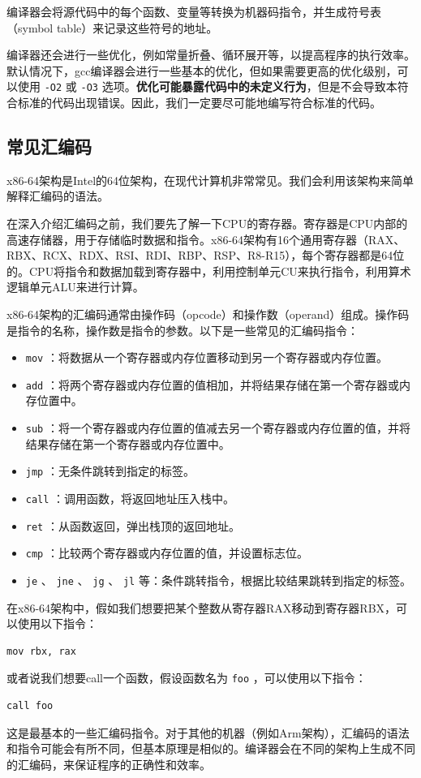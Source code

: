 编译器会将源代码中的每个函数、变量等转换为机器码指令，并生成符号表（symbol table）来记录这些符号的地址。

编译器还会进行一些优化，例如常量折叠、循环展开等，以提高程序的执行效率。默认情况下，gcc编译器会进行一些基本的优化，但如果需要更高的优化级别，可以使用 \texttt{-O2} 或 \texttt{-O3} 选项。\textbf{优化可能暴露代码中的未定义行为}，但是不会导致本符合标准的代码出现错误。因此，我们一定要尽可能地编写符合标准的代码。

\subsection{常见汇编码}

x86-64架构是Intel的64位架构，在现代计算机非常常见。我们会利用该架构来简单解释汇编码的语法。

在深入介绍汇编码之前，我们要先了解一下CPU的寄存器。寄存器是CPU内部的高速存储器，用于存储临时数据和指令。x86-64架构有16个通用寄存器（RAX、RBX、RCX、RDX、RSI、RDI、RBP、RSP、R8-R15），每个寄存器都是64位的。CPU将指令和数据加载到寄存器中，利用控制单元CU来执行指令，利用算术逻辑单元ALU来进行计算。

x86-64架构的汇编码通常由操作码（opcode）和操作数（operand）组成。操作码是指令的名称，操作数是指令的参数。以下是一些常见的汇编码指令：
\begin{itemize}
  \item  \texttt{mov} ：将数据从一个寄存器或内存位置移动到另一个寄存器或内存位置。
  \item  \texttt{add} ：将两个寄存器或内存位置的值相加，并将结果存储在第一个寄存器或内存位置中。
  \item  \texttt{sub} ：将一个寄存器或内存位置的值减去另一个寄存器或内存位置的值，并将结果存储在第一个寄存器或内存位置中。
  \item  \texttt{jmp} ：无条件跳转到指定的标签。
  \item  \texttt{call} ：调用函数，将返回地址压入栈中。
  \item  \texttt{ret} ：从函数返回，弹出栈顶的返回地址。
  \item  \texttt{cmp} ：比较两个寄存器或内存位置的值，并设置标志位。
  \item  \texttt{je} 、 \texttt{jne} 、 \texttt{jg} 、 \texttt{jl} 等：条件跳转指令，根据比较结果跳转到指定的标签。
\end{itemize}

在x86-64架构中，假如我们想要把某个整数从寄存器RAX移动到寄存器RBX，可以使用以下指令：
\begin{verbatim}
mov rbx, rax
\end{verbatim}
或者说我们想要call一个函数，假设函数名为 \texttt{foo} ，可以使用以下指令：
\begin{verbatim}
call foo
\end{verbatim}
这是最基本的一些汇编码指令。对于其他的机器（例如Arm架构），汇编码的语法和指令可能会有所不同，但基本原理是相似的。编译器会在不同的架构上生成不同的汇编码，来保证程序的正确性和效率。

